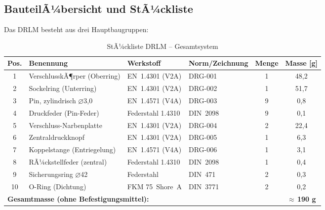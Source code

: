 ﻿\documentclass[12pt, a4paper]{article}
\theoremstyle{remark}
\begin{document}
\subsection{BauteilÃ¼bersicht und StÃ¼ckliste}

Das DRLM besteht aus drei Hauptbaugruppen:

\begin{table}
  \centering
  \caption{StÃ¼ckliste DRLM -- Gesamtsystem}
  \label{tab:stueckliste}
  \renewcommand{\arraystretch}{1.3}
  \begin{tabular}{clllcc}
    \toprule
    \textbf{Pos.} & \textbf{Benennung} & \textbf{Werkstoff} & \textbf{Norm/Zeichnung} & \textbf{Menge} & \textbf{Masse [g]} \\
    \midrule
    1  & VerschlusskÃ¶rper (Oberring)    & EN~1.4301 (V2A)       & DRG-001 & 1  & 48{,}2 \\
    2  & Sockelring (Unterring)         & EN~1.4301 (V2A)       & DRG-002 & 1  & 51{,}7 \\
    3  & Pin, zylindrisch $\varnothing$3{,}0    & EN~1.4571 (V4A)       & DRG-003 & 9  &  0{,}8 \\
    4  & Druckfeder (Pin-Feder)         & Federstahl 1.4310     & DIN~2098 & 9  &  0{,}1 \\
    5  & Verschluss-Narbenplatte        & EN~1.4301 (V2A)       & DRG-004 & 2  & 22{,}4 \\
    6  & Zentraldruckknopf              & EN~1.4301 (V2A)       & DRG-005 & 1  &  6{,}3 \\
    7  & Koppelstange (Entriegelung)    & EN~1.4571 (V4A)       & DRG-006 & 1  &  3{,}1 \\
    8  & RÃ¼ckstellfeder (zentral)       & Federstahl 1.4310     & DIN~2098 & 1  &  0{,}4 \\
    9  & Sicherungsring $\varnothing$42        & Federstahl            & DIN~471  & 2  &  0{,}3 \\
    10 & O-Ring (Dichtung)              & FKM 75~Shore~A        & DIN~3771 & 2  &  0{,}2 \\
    \midrule
    \multicolumn{5}{l}{\textbf{Gesamtmasse (ohne Befestigungsmittel):}} & \textbf{$\approx$\,190 g} \\
    \bottomrule
  \end{tabular}
\end{table}

\end{document}
